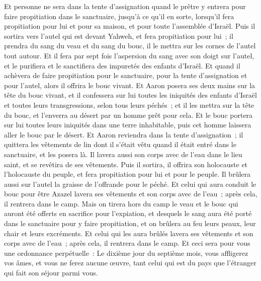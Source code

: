 \begin{multicols}{2}
Et personne ne sera dans la tente d'assignation quand le prêtre y entrera pour faire propitiation dans le sanctuaire, jusqu'à ce qu'il en sorte, lorsqu'il fera propitiation pour lui et pour sa maison, et pour toute l'assemblée d'Israël.
Puis il sortira vers l'autel qui est devant Yahweh, et fera propitiation pour lui~; il prendra du sang du veau et du sang du bouc, il le mettra sur les cornes de l'autel tout autour.
Et il fera par sept fois l'aspersion du sang avec son doigt sur l'autel, et le purifiera et le sanctifiera des impuretés des enfants d'Israël.
Et quand il achèvera de faire propitiation pour le sanctuaire, pour la tente d'assignation et pour l'autel, alors il offrira le bouc vivant.
Et Aaron posera ses deux mains sur la tête du bouc vivant, et il confessera sur lui toutes les iniquités des enfants d'Israël et toutes leurs transgressions, selon tous leurs péchés~; et il les mettra sur la tête du bouc, et l'enverra au désert par un homme prêt pour cela.
Et le bouc portera sur lui toutes leurs iniquités dans une terre inhabitable, puis cet homme laissera aller le bouc par le désert.
Et Aaron reviendra dans la tente d'assignation~; il quittera les vêtements de lin dont il s'était vêtu quand il était entré dans le sanctuaire, et les posera là.
Il lavera aussi son corps avec de l'eau dans le lieu saint, et se revêtira de ses vêtements. Puis il sortira, il offrira son holocauste et l'holocauste du peuple, et fera propitiation pour lui et pour le peuple.
Il brûlera aussi sur l'autel la graisse de l'offrande pour le péché.
Et celui qui aura conduit le bouc pour être Azazel lavera ses vêtements et son corps avec de l'eau~; après cela, il rentrera dans le camp.
Mais on tirera hors du camp le veau et le bouc qui auront été offerts en sacrifice pour l'expiation, et desquels le sang aura été porté dans le sanctuaire pour y faire propitiation, et on brûlera au feu leurs peaux, leur chair et leurs excréments.
Et celui qui les aura brûlés lavera ses vêtements et son corps avec de l'eau~; après cela, il rentrera dans le camp.
Et ceci sera pour vous une ordonnance perpétuelle~: Le dixième jour du septième mois, vous affligerez vos âmes, et vous ne ferez aucune œuvre, tant celui qui est du pays que l'étranger qui fait son séjour parmi vous.

\end{multicols}

